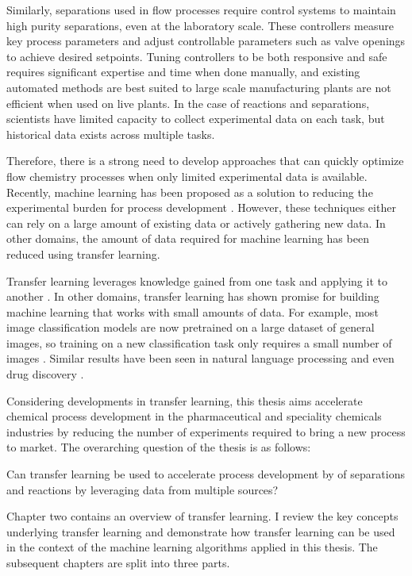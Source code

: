 Similarly, separations used in flow processes require control systems to maintain high purity separations, even at the laboratory scale. These controllers measure key process parameters and adjust controllable parameters such as valve openings to achieve desired setpoints. Tuning controllers to be both responsive and safe requires significant expertise and time when done manually, and existing automated methods are best suited to large scale manufacturing plants are not efficient when used on live plants. In the case of reactions and separations, scientists have limited capacity to collect experimental data on each task, but historical data exists across multiple tasks.

Therefore, there is a strong need to develop approaches that can quickly optimize flow chemistry processes when only limited experimental data is available. Recently, machine learning has been proposed as a solution to reducing the experimental burden for process development \cite{Taylor2023a}.  However, these techniques either can rely on a large amount of existing data or actively gathering new data.  In other domains, the amount of data required for machine learning has been reduced using transfer learning. 

Transfer learning leverages knowledge gained from one task and applying it to another \cite{Zhuang2021}. In other domains, transfer learning has shown promise for building machine learning that works with small amounts of data. For example, most image classification models are now pretrained on a large dataset of general images, so training on a new classification task only requires a small number of images \cite{He2016}. Similar results have been seen in natural language processing \cite{Brown2020} and even drug discovery \cite{Ramsundar2017}. 

Considering developments in transfer learning, this thesis aims accelerate chemical process development in the pharmaceutical and speciality chemicals industries by reducing the number of experiments required to bring a new process to market. The overarching question of the thesis is as follows:
\begin{displayquote}
Can transfer learning be used to accelerate process development by of separations and reactions by leveraging data from multiple sources? 
\end{displayquote}
Chapter two contains an overview of transfer learning. I review the key concepts underlying transfer learning and demonstrate how transfer learning can be used in the context of the machine learning algorithms applied in this thesis.  The subsequent chapters are split into three parts.

